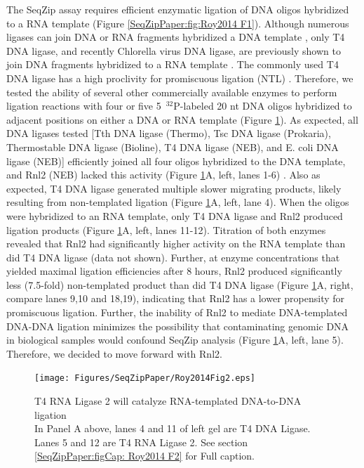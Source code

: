 		The SeqZip assay requires efficient enzymatic ligation of DNA oligos hybridized to a RNA template (Figure \ref{SeqZipPaper:fig:Roy2014 F1}). Although numerous ligases can join DNA or RNA fragments hybridized a DNA template \citep{Bullard2006}, only T4 DNA ligase, and recently Chlorella virus DNA ligase, are previously shown to join DNA fragments hybridized to a RNA template \citep{Nilsson2001,Lohman2013c}. The commonly used T4 DNA ligase has a high proclivity for promiscuous ligation (NTL) \citep{Kuhn2005}. Therefore, we tested the ability of several other commercially available enzymes to perform ligation reactions with four or five 5\textprime~$^{32}$P-labeled 20 nt DNA oligos hybridized to adjacent positions on either a DNA or RNA template (Figure \ref{SeqZipPaper:fig:Roy2014 F2}). As expected, all DNA ligases tested [Tth DNA ligase (Thermo), Tsc DNA ligase (Prokaria), Thermostable DNA ligase (Bioline), T4 DNA ligase (NEB), and E. coli DNA ligase (NEB)] efficiently joined all four oligos hybridized to the DNA template, and Rnl2 (NEB) lacked this activity (Figure \ref{SeqZipPaper:fig:Roy2014 F2}A, left, lanes 1-6) \citep{Bullard2006}. Also as expected, T4 DNA ligase generated multiple slower migrating products, likely resulting from non-templated ligation (Figure \ref{SeqZipPaper:fig:Roy2014 F2}A, left, lane 4). When the oligos were hybridized to an RNA template, only T4 DNA ligase and Rnl2 produced ligation products (Figure \ref{SeqZipPaper:fig:Roy2014 F2}A, left, lanes 11-12). Titration of both enzymes revealed that Rnl2 had significantly higher activity on the RNA template than did T4 DNA ligase (data not shown). Further, at enzyme concentrations that yielded maximal ligation efficiencies after 8 hours, Rnl2 produced significantly less (7.5-fold) non-templated product than did T4 DNA ligase (Figure \ref{SeqZipPaper:fig:Roy2014 F2}A, right, compare lanes 9,10 and 18,19), indicating that Rnl2 has a lower propensity for promiscuous ligation. Further, the inability of Rnl2 to mediate DNA-templated DNA-DNA ligation minimizes the possibility that contaminating genomic DNA in biological samples would confound SeqZip analysis (Figure \ref{SeqZipPaper:fig:Roy2014 F2}A, left, lane 5). Therefore, we decided to move forward with Rnl2.

		\begin{figure} %
			\centering 
			\texttt{[image: Figures/SeqZipPaper/Roy2014Fig2.eps]}
			\caption[T4 RNA Ligase 2 will catalyze RNA-templated DNA-to-DNA ligation]
			{
				T4 RNA Ligase 2 will catalyze RNA-templated DNA-to-DNA ligation \\[0.25cm]
				In Panel A above, lanes 4  and 11 of left gel are T4 DNA Ligase. Lanes 5 and 12 are T4 RNA Ligase 2. See section \ref{SeqZipPaper:figCap: Roy2014 F2} for Full caption.
				}
			\label{SeqZipPaper:fig:Roy2014 F2}
			\end{figure}

